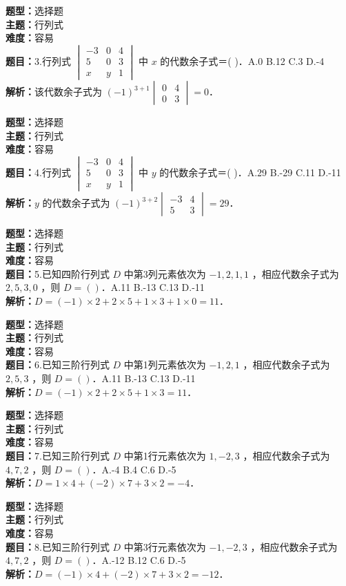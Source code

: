 \documentclass{ctexart}
\newenvironment{question}[5]{%
	\noindent\textbf{题型：}#1\\
	\textbf{主题：}#2\\
	\textbf{难度：}#3\\
	\textbf{题目：}#4\\
	\textbf{解析：}#5\\
	\vspace{1em}
}{}
\begin{document}
	\begin{question}
		{选择题}
		{行列式}
		{容易}
		{3.行列式 \(\begin{vmatrix}-3 & 0 & 4 \\ 5 & 0 & 3 \\ x & y & 1\end{vmatrix}\) 中 \(x\) 的代数余子式＝(  )．A.0 B.12 C.3 D.-4}
		{该代数余子式为 \((-1)^{3+1}\begin{vmatrix}0 & 4 \\ 0 & 3\end{vmatrix}=0\)．}
	\end{question}
	
	\begin{question}
		{选择题}
		{行列式}
		{容易}
		{4.行列式 \(\begin{vmatrix}-3 & 0 & 4 \\ 5 & 0 & 3 \\ x & y & 1\end{vmatrix}\) 中 \(y\) 的代数余子式＝(  )．A.29 B.-29 C.11 D.-11}
		{\(y\) 的代数余子式为 \((-1)^{3+2}\begin{vmatrix}-3 & 4 \\ 5 & 3\end{vmatrix}=29\)．}
	\end{question}
	
	\begin{question}
		{选择题}
		{行列式}
		{容易}
		{5.已知四阶行列式 \(D\) 中第3列元素依次为 \(-1,2,1,1\) ，相应代数余子式为 \(2,5,3,0\) ，则 \(D=(  )\)．A.11 B.-13 C.13 D.-11}
		{\(D = (-1) \times 2 + 2 \times 5 + 1 \times 3 + 1 \times 0 = 11\)．}
	\end{question}
	
	\begin{question}
		{选择题}
		{行列式}
		{容易}
		{6.已知三阶行列式 \(D\) 中第1列元素依次为 \(-1,2,1\) ，相应代数余子式为 \(2,5,3\) ，则 \(D=(  )\)．A.11 B.-13 C.13 D.-11}
		{\(D = (-1) \times 2 + 2 \times 5 + 1 \times 3 = 11\)．}
	\end{question}
	
	\begin{question}
		{选择题}
		{行列式}
		{容易}
		{7.已知三阶行列式 \(D\) 中第1行元素依次为 \(1,-2,3\) ，相应代数余子式为 \(4,7,2\) ，则 \(D=(  )\)．A.-4 B.4 C.6 D.-5}
		{\(D = 1 \times 4 + (-2) \times 7 + 3 \times 2 = -4\)．}
	\end{question}
	
	\begin{question}
		{选择题}
		{行列式}
		{容易}
		{8.已知三阶行列式 \(D\) 中第3行元素依次为 \(-1,-2,3\) ，相应代数余子式为 \(4,7,2\) ，则 \(D=(  )\)．A.-12 B.12 C.6 D.-5}
		{\(D = (-1) \times 4 + (-2) \times 7 + 3 \times 2 = -12\)．}
	\end{question}
	
\end{document}
